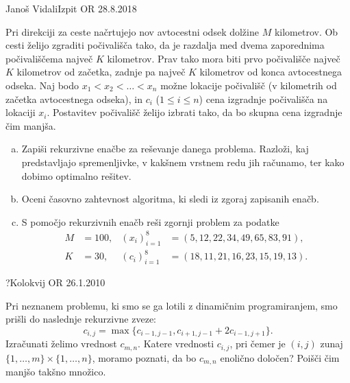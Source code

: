 \begin{naloga}{Janoš Vidali}{Izpit OR 28.8.2018}
\begin{vprasanje}
Pri direkciji za ceste načrtujejo nov avtocestni odsek dolžine $M$ kilometrov.
Ob cesti želijo zgraditi počivališča tako,
da je razdalja med dvema zaporednima počivališčema največ $K$ kilometrov.
Prav tako mora biti prvo počivališče največ $K$ kilometrov od začetka,
zadnje pa največ $K$ kilometrov od konca avtocestnega odseka.
Naj bodo $x_1 < x_2 < \dots < x_n$ možne lokacije počivališč
(v kilometrih od začetka avtocestnega odseka),
in $c_i$ ($1 \le i \le n$) cena izgradnje počivališča na lokaciji $x_i$.
Postavitev počivališč želijo izbrati tako,
da bo skupna cena izgradnje čim manjša.

\begin{enumerate}[(a)]
\item Zapiši rekurzivne enačbe za reševanje danega problema.
Razloži, kaj predstavljajo spremenljivke,
v kakšnem vrstnem redu jih računamo, ter kako dobimo optimalno rešitev.

\item Oceni časovno zahtevnost algoritma, ki sledi iz zgoraj zapisanih enačb.

\item S pomočjo rekurzivnih enačb reši zgornji problem za podatke
\begin{align*}
M &= 100, & (x_i)_{i=1}^8 &= ( 5, 12, 22, 34, 49, 65, 83, 91), \\
K &= 30,  & (c_i)_{i=1}^8 &= (18, 11, 21, 16, 23, 15, 19, 13).
\end{align*}
\end{enumerate}
\end{vprasanje}
\begin{odgovor}
\end{odgovor}
\end{naloga}


\begin{naloga}{?}{Kolokvij OR 26.1.2010}
\begin{vprasanje}
Pri neznanem problemu, ki smo se ga lotili z dinamičnim programiranjem,
smo prišli do naslednje rekurzivne zveze:
$$
c_{i,j} = \max\{c_{i-1,j-1}, c_{i+1,j-1} + 2c_{i-1,j+1}\} .
$$
Izračunati želimo vrednost $c_{m,n}$.
Katere vrednosti $c_{i,j}$,
pri čemer je $(i, j)$ zunaj $\{1, \dots, m\} \times \{1, \dots, n\}$,
moramo poznati, da bo $c_{m,n}$ enolično določen?
Poišči čim manjšo takšno množico.
\end{vprasanje}
\begin{odgovor}
\end{odgovor}
\end{naloga}


